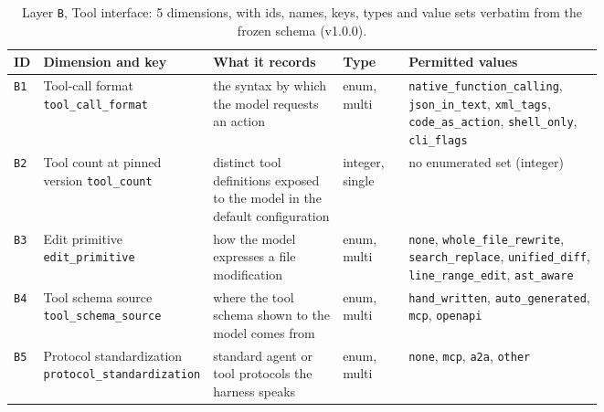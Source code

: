 \begin{table}[htbp]
\caption{Layer \texttt{B}, Tool interface: 5 dimensions, with ids, names, keys, types and value
sets verbatim from the frozen schema (v1.0.0).}
\label{tab:coding-B}
\footnotesize
\begin{tabular}{@{}l p{0.20\linewidth} p{0.22\linewidth} l p{0.33\linewidth}@{}}
\toprule
ID & Dimension and key & What it records & Type & Permitted values \tabularnewline
\midrule
\texttt{B1} & \raggedright Tool-call format \newline \texttt{tool\_call\_format} & \raggedright the syntax by which the model requests an action & enum, multi & \raggedright \texttt{native\_function\_calling}, \texttt{json\_in\_text}, \texttt{xml\_tags}, \texttt{code\_as\_action}, \texttt{shell\_only}, \texttt{cli\_flags} \tabularnewline
\texttt{B2} & \raggedright Tool count at pinned version \newline \texttt{tool\_count} & \raggedright distinct tool definitions exposed to the model in the default configuration & integer, single & \raggedright no enumerated set (integer) \tabularnewline
\texttt{B3} & \raggedright Edit primitive \newline \texttt{edit\_primitive} & \raggedright how the model expresses a file modification & enum, multi & \raggedright \texttt{none}, \texttt{whole\_file\_rewrite}, \texttt{search\_replace}, \texttt{unified\_diff}, \texttt{line\_range\_edit}, \texttt{ast\_aware} \tabularnewline
\texttt{B4} & \raggedright Tool schema source \newline \texttt{tool\_schema\_source} & \raggedright where the tool schema shown to the model comes from & enum, multi & \raggedright \texttt{hand\_written}, \texttt{auto\_generated}, \texttt{mcp}, \texttt{openapi} \tabularnewline
\texttt{B5} & \raggedright Protocol standardization \newline \texttt{protocol\_standardization} & \raggedright standard agent or tool protocols the harness speaks & enum, multi & \raggedright \texttt{none}, \texttt{mcp}, \texttt{a2a}, \texttt{other} \tabularnewline
\bottomrule
\end{tabular}
\end{table}

